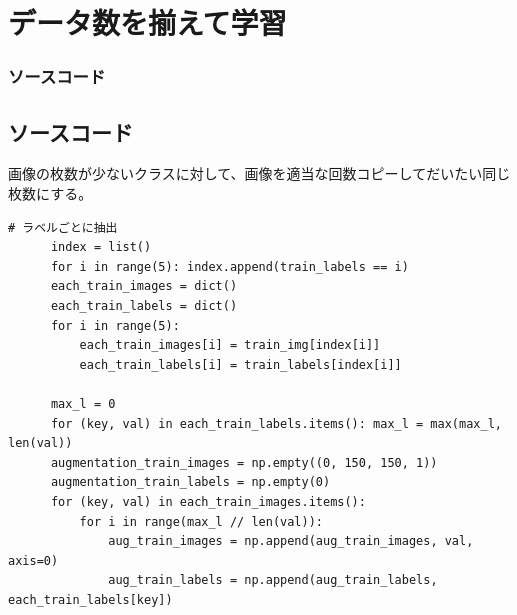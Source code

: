 \documentclass[leno,xcolor=dvipsnames]{beamer}
\begin{document}
  \section{データ数を揃えて学習}
  \begin{frame}[fragile]
    \frametitle{ソースコード}
    \subsection{ソースコード}
    画像の枚数が少ないクラスに対して、画像を適当な回数コピーしてだいたい同じ枚数にする。
    \begin{lstlisting}[caption=augmentation.py]
      # ラベルごとに抽出
      index = list()
      for i in range(5): index.append(train_labels == i)
      each_train_images = dict()
      each_train_labels = dict()
      for i in range(5):
          each_train_images[i] = train_img[index[i]]
          each_train_labels[i] = train_labels[index[i]]
  
      max_l = 0
      for (key, val) in each_train_labels.items(): max_l = max(max_l, len(val))
      augmentation_train_images = np.empty((0, 150, 150, 1))
      augmentation_train_labels = np.empty(0)
      for (key, val) in each_train_images.items():
          for i in range(max_l // len(val)):
              aug_train_images = np.append(aug_train_images, val, axis=0)
              aug_train_labels = np.append(aug_train_labels, each_train_labels[key])
    \end{lstlisting}
  \end{frame}
\end{document}
